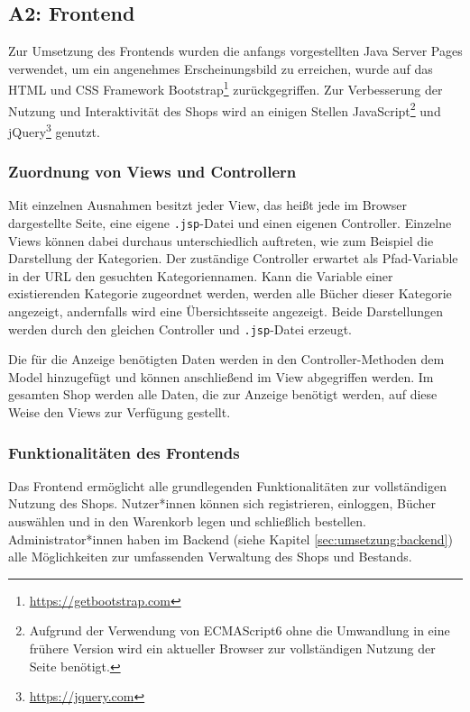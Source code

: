 	\subsection{A2: Frontend}
	Zur Umsetzung des Frontends wurden die anfangs vorgestellten Java Server Pages verwendet, um ein angenehmes Erscheinungsbild zu erreichen, wurde auf das HTML und CSS Framework Bootstrap\footnote{\hyperlink{https://getbootstrap.com}{https://getbootstrap.com}} zurückgegriffen. Zur Verbesserung der Nutzung und Interaktivität des Shops wird an einigen Stellen JavaScript\footnote{Aufgrund der Verwendung von ECMAScript6 ohne die Umwandlung in eine frühere Version wird ein aktueller Browser zur vollständigen Nutzung der Seite benötigt.} und jQuery\footnote{\hyperlink{https://jquery.com}{https://jquery.com}} genutzt.
	
		\subsubsection{Zuordnung von Views und Controllern}	
		Mit einzelnen Ausnahmen besitzt jeder View, das heißt jede im Browser dargestellte Seite, eine eigene \lstinline|.jsp|-Datei und einen eigenen Controller. Einzelne Views können dabei durchaus unterschiedlich auftreten, wie zum Beispiel die Darstellung der Kategorien. Der zuständige Controller erwartet als Pfad-Variable in der URL den gesuchten Kategoriennamen. Kann die Variable einer existierenden Kategorie zugeordnet werden, werden alle Bücher dieser Kategorie angezeigt, andernfalls wird eine Übersichtsseite angezeigt. Beide Darstellungen werden durch den gleichen Controller und \lstinline|.jsp|-Datei erzeugt.
		
		Die für die Anzeige benötigten Daten werden in den Controller-Methoden dem Model hinzugefügt und können anschließend im View abgegriffen werden. Im gesamten Shop werden alle Daten, die zur Anzeige benötigt werden, auf diese Weise den Views zur Verfügung gestellt.
		
		\subsubsection{Funktionalitäten des Frontends}
		Das Frontend ermöglicht alle grundlegenden Funktionalitäten zur vollständigen Nutzung des Shops. Nutzer*innen können sich registrieren, einloggen, Bücher auswählen und in den Warenkorb legen und schließlich bestellen. Administrator*innen haben im Backend (siehe Kapitel \ref{sec:umsetzung:backend}) alle Möglichkeiten zur umfassenden Verwaltung des Shops und Bestands.
		
